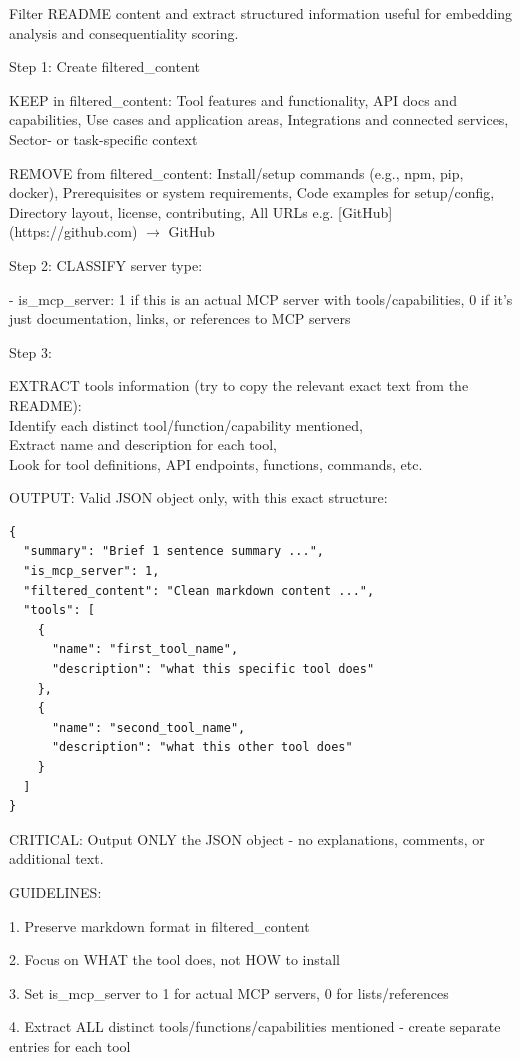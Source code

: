 \documentclass[manuscript,screen,nonacm,oneside]{acmart}
\begin{document}
Filter README content and extract structured information useful for embedding analysis and consequentiality scoring.

Step 1: Create filtered\_content

KEEP in filtered\_content: Tool features and functionality, API docs and capabilities, Use cases and application areas, Integrations and connected services, Sector- or task-specific context

REMOVE from filtered\_content: Install/setup commands (e.g., npm, pip, docker), Prerequisites or system requirements, Code examples for setup/config, Directory layout, license, contributing, All URLs e.g. [GitHub](https://github.com) $\rightarrow$ GitHub

Step 2: CLASSIFY server type:

- is\_mcp\_server: 1 if this is an actual MCP server with tools/capabilities, 0 if it's just documentation, links, or references to MCP servers

Step 3:

EXTRACT tools information (try to copy the relevant exact text from the README):\\
Identify each distinct tool/function/capability mentioned,\\
Extract name and description for each tool,\\
Look for tool definitions, API endpoints, functions, commands, etc.

OUTPUT: Valid JSON object only, with this exact structure:

\begin{lstlisting}
{
  "summary": "Brief 1 sentence summary ...",
  "is_mcp_server": 1,
  "filtered_content": "Clean markdown content ...",
  "tools": [
    {
      "name": "first_tool_name",
      "description": "what this specific tool does"
    },
    {
      "name": "second_tool_name",
      "description": "what this other tool does"
    }
  ]
}
\end{lstlisting}

CRITICAL: Output ONLY the JSON object - no explanations, comments, or additional text.

GUIDELINES:

1. Preserve markdown format in filtered\_content

2. Focus on WHAT the tool does, not HOW to install

3. Set is\_mcp\_server to 1 for actual MCP servers, 0 for lists/references

4. Extract ALL distinct tools/functions/capabilities mentioned - create separate entries for each tool
\end{document}

